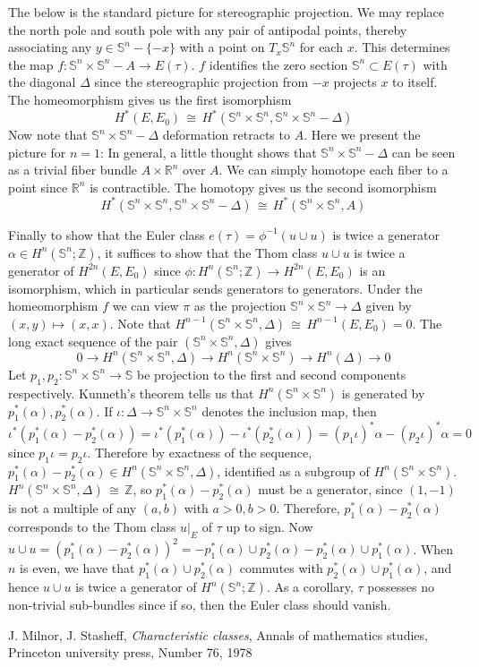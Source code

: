 \documentclass[12pt]{article}
\theoremstyle{plain}
\theoremstyle{definition}
\newcommand{\IR}{\mathbb{R}}
\newcommand{\IS}{\mathbb{S}}
\newcommand{\IZ}{\mathbb{Z}}
\newcommand\iso{\,{\cong}\,}
\newcommand{\<}{\langle}
\renewcommand{\>}{\rangle}
\begin{document}
The below is the standard picture for stereographic projection. We may replace the north pole and south pole with any pair of antipodal points, thereby associating any $ y \in \IS^n - \{ -x \}$ with a point on $T_x \IS^n$ for each $x$. This determines the map $f : \IS^n \times \IS^n - A \to E(\tau)$. $f$ identifies the zero section $\IS^n \subset E(\tau)$ with the diagonal $\Delta$ since the stereographic projection from $-x$ projects $x$ to itself. The homeomorphism gives us the first isomorphism 
$$ H^*(E, E_0) \iso H^*(\IS^n \times \IS^n, \IS^n \times \IS^n - \Delta) $$
Now note that $\IS^n \times \IS^n - \Delta$ deformation retracts to $A$. Here we present the picture for $n = 1$: 
In general, a little thought shows that $\IS^n \times \IS^n - \Delta$ can be seen as a trivial fiber bundle $A \times \IR^n$ over $A$. We can simply homotope each fiber to a point since $\IR^n$ is contractible. The homotopy gives us the second isomorphism
$$ H^*(\IS^n \times \IS^n, \IS^n \times \IS^n - \Delta) \iso H^*(\IS^n \times \IS^n, A) $$

Finally to show that the Euler class $e(\tau) = \phi^{-1}( u \cup u)$ is twice a generator $\alpha \in H^n(\IS^n; \IZ)$, it suffices to show that the Thom class $u \cup u$ is twice a generator of $H^{2n}(E, E_0)$ since $\phi : H^n(\IS^n; \IZ) \to H^{2n}(E, E_0)$ is an isomorphism, which in particular sends generators to generators. Under the homeomorphism $f$ we can view $\pi$ as the projection $\IS^n \times \IS^n \to \Delta$ given by $(x, y) \mapsto (x, x)$. Note that $H^{n-1}(\IS^n \times \IS^n, \Delta) \iso H^{n-1}(E, E_0) = 0$. The long exact sequence of the pair $(\IS^n \times \IS^n, \Delta)$ gives 
$$ 0 \to H^n(\IS^n \times \IS^n, \Delta) \to H^n(\IS^n \times \IS^n) \to H^n(\Delta) \to 0$$
Let $p_1, p_2 : \IS^n \times \IS^n \to \IS$ be projection to the first and second components respectively. Kunneth's theorem tells us that 
$H^n(\IS^n \times \IS^n)$ is generated by $p_1^*(\alpha), p_2^*(\alpha)$. If $\iota : \Delta \to \IS^n \times \IS^n$ denotes the inclusion map, then $$\iota^*(p_1^*(\alpha)- p_2^*(\alpha)) = \iota^*(p_1^*(\alpha)) - \iota^*(p_2^*(\alpha)) = (p_1 \iota)^* \alpha - (p_2 \iota)^* \alpha = 0$$
since $p_1 \iota = p_2 \iota$. Therefore by exactness of the sequence, $p_1^*(\alpha) - p_2^*(\alpha) \in H^n(\IS^n \times \IS^n, \Delta)$, identified as a subgroup of $H^n(\IS^n \times \IS^n)$. $H^n(\IS^n \times \IS^n, \Delta) \iso \IZ$, so $p_1^*(\alpha) - p_2^*(\alpha)$ must be a generator, since $(1, -1)$ is not a multiple of any $(a, b)$ with $a > 0, b> 0$. Therefore, $p_1^*(\alpha) - p_2^*(\alpha)$ corresponds to the Thom class $u|_E$ of $\tau$ up to sign. Now $u \cup u = (p_1^*(\alpha) - p_2^*(\alpha))^2 = - p_1^*(\alpha) \cup  p_2^*(\alpha) - p_2^*(\alpha) \cup  p_1^*(\alpha)$. When $n$ is even, we have that $p_1^*(\alpha) \cup  p_2^*(\alpha)$ commutes with $p_2^*(\alpha) \cup  p_1^*(\alpha)$, and hence $u \cup u$ is twice a generator of $H^n(\IS^n; \IZ)$. As a corollary, $\tau$ possesses no non-trivial sub-bundles since if so, then the Euler class should vanish. 


\begin{thebibliography}{9}


  J. Milnor, J. Stasheff, \textit{Characteristic classes}, Annals of mathematics studies, Princeton university press, Number 76, 1978
\end{thebibliography}
\end{document}
